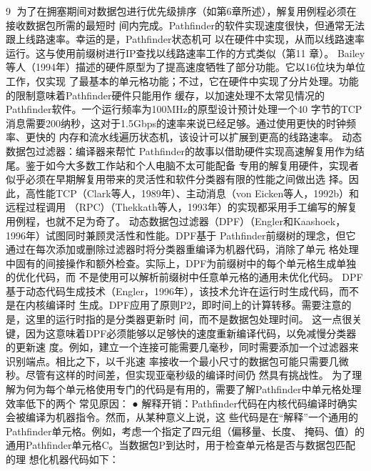                                                         9
为了在拥塞期间对数据包进行优先级排序（如第6章所述），解复用例程必须在接收数据包所需的最短时
间内完成。Pathfinder的软件实现速度很快，但通常无法跟上线路速率。幸运的是，Pathfinder状态机可
以在硬件中实现，从而以线路速率运行。这与使用前缀树进行IP查找以线路速率工作的方式类似（第11
章）。
Bailey等人（1994年）描述的硬件原型为了提高速度牺牲了部分功能。它以16位块为单位工作，仅实现
了最基本的单元格功能；不过，它在硬件中实现了分片处理。功能的限制意味着Pathfinder硬件只能用作
缓存，以加速处理不太常见情况的Pathfinder软件。一个运行频率为100MHz的原型设计预计处理一个40
字节的TCP消息需要200纳秒，这对于1.5Gbps的速率来说已经足够。通过使用更快的时钟频率、更快的
内存和流水线遍历状态机，该设计可以扩展到更高的线路速率。
动态数据包过滤器：编译器来帮忙
Pathfinder的故事以借助硬件实现高速解复用作为结尾。鉴于如今大多数工作站和个人电脑不太可能配备
专用的解复用硬件，实现者似乎必须在早期解复用带来的灵活性和软件分类器有限的性能之间做出选
择。因此，高性能TCP（Clark等人，1989年）、主动消息（von Eicken等人，1992b）和远程过程调用
（RPC）（Thekkath等人，1993年）的实现都采用手工编写的解复用例程，也就不足为奇了。
动态数据包过滤器（DPF）（Engler和Kaashoek，1996年）试图同时兼顾灵活性和性能。DPF基于
Pathfinder前缀树的理念，但它通过在每次添加或删除过滤器时将分类器重编译为机器代码，消除了单元
格处理中固有的间接操作和额外检查。实际上，DPF为前缀树中的每个单元格生成单独的优化代码，而
不是使用可以解析前缀树中任意单元格的通用未优化代码。
DPF基于动态代码生成技术（Engler，1996年），该技术允许在运行时生成代码，而不是在内核编译时
生成。DPF应用了原则P2，即时间上的计算转移。需要注意的是，这里的运行时指的是分类器更新时
间，而不是数据包处理时间。
这一点很关键，因为这意味着DPF必须能够以足够快的速度重新编译代码，以免减慢分类器的更新速
度。例如，建立一个连接可能需要几毫秒，同时需要添加一个过滤器来识别端点。相比之下，以千兆速
率接收一个最小尺寸的数据包可能只需要几微秒。尽管有这样的时间差，但实现亚毫秒级的编译时间仍
然具有挑战性。
为了理解为何为每个单元格使用专门的代码是有用的，需要了解Pathfinder中单元格处理效率低下的两个
常见原因：
 ● 解释开销：Pathfinder代码在内核代码编译时确实会被编译为机器指令。然而，从某种意义上说，这
    些代码是在“解释”一个通用的Pathfinder单元格。例如，考虑一个指定了四元组（偏移量、长度、
    掩码、值）的通用Pathfinder单元格C。当数据包P到达时，用于检查单元格是否与数据包匹配的理
    想化机器代码如下：


